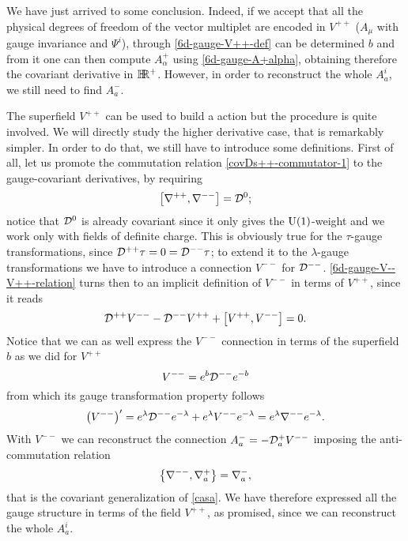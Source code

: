 We  have just arrived to some conclusion. Indeed, if we accept that all the physical degrees of freedom of the vector multiplet are encoded in $V^{++}$ (\ie $A_\mu$ with gauge invariance and $\Psi^i$), through \eqref{6d-gauge-V++-def} can be determined $b$ and from it one can then compute $A^+_\alpha$ using \eqref{6d-gauge-A+alpha}, obtaining therefore the covariant derivative in $\mathbb{H}\hspace{-0.385em}\mathbb{R}^+$. However, in order to reconstruct the whole $A^i_a$, we still need to find $A^-_a$.


The superfield $V^{++}$ can be used to build a \sym{} action but the procedure is quite involved. We will directly study the higher derivative case, that is remarkably simpler. In order to do that, we still have to introduce some definitions. First of all, let us promote the commutation relation \eqref{covDs++-commutator-1} to the gauge-covariant derivatives,  by requiring
\begin{equation}
\label{6d-gauge-V--V++-relation}
\left[
	{ \mathcal{\nabla} }^{++} ,  { \mathcal{\nabla} }^{--}
\right]
	= { \mathcal{D} }^{0};
\end{equation}
notice that ${ \mathcal{D} }^0$ is already covariant since it only gives the ${ \text{U} }(1)$-weight and we work only with fields of definite charge.
This is obviously true for the $\tau$-gauge transformations, since ${ \mathcal{D} }^{++} \tau = 0 = { \mathcal{D} }^{--} \tau $; to extend it to the $\lambda$-gauge transformations we have to introduce a connection $V^{--}$ for ${ \mathcal{D} }^{--}$. \eqref{6d-gauge-V--V++-relation} turns then to an implicit definition of $V^{--}$ in terms of $V^{++}$, since it reads
\begin{equation}\label{6d-gauge-V--V++-differential-relation}
{ \mathcal{D} }^{++} V^{--} - { \mathcal{D} }^{--} V^{++} + \left[ V^{++} , V^{--} \right] = 0.
\end{equation}
Notice that we can as well express the $V^{--}$ connection in terms of the superfield $b$ as we did for $V^{++}$  
\begin{equation}\label{6d-gauge-V---def}
V^{--} = e^{b} { \mathcal{D} }^{--} e^{-b}
\end{equation}
from which its gauge transformation property follows
\begin{equation}\label{6d-gauge-V---gauge-transf}
\left( V^{--} \right)' 
	=
e^{\lambda} { \mathcal{D} }^{--} e^{-\lambda} + e^{\lambda} V^{--} e^{-\lambda}
	=
e^{\lambda} { \mathcal{\nabla} }^{--} e^{-\lambda}.
\end{equation}
With $V^{--}$ we can reconstruct the connection $A^-_a = - { \mathcal{D} }^+_a V^{--}$ imposing the anti-commutation relation
\begin{equation}
\left\{
{ \mathcal{\nabla} }^{--}, { \mathcal{\nabla} }^+_a
\right\} = { \mathcal{\nabla} }^-_a,
\end{equation}
that is the covariant generalization of \eqref{casa}.
We have therefore expressed all the gauge structure in terms of the field $V^{++}$, as promised, since we can reconstruct the whole $A^i_a$.



